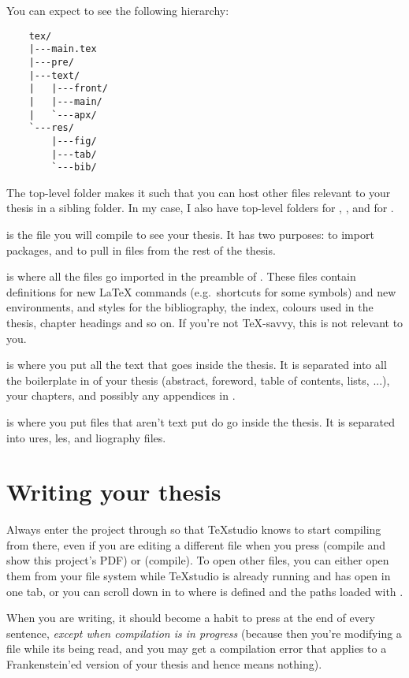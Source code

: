 You can expect to see the following hierarchy:

\begin{BVerbatim}
	tex/
	|---main.tex
	|---pre/
	|---text/
	|   |---front/
	|   |---main/
	|   `---apx/
	`---res/
	    |---fig/
	    |---tab/
	    `---bib/
\end{BVerbatim}

The top-level folder  makes it such that you can host other files relevant to your thesis in a sibling folder. In my case, I also have top-level folders for , , and for .

 is the file you will compile to see your thesis. It has two purposes: to import packages, and to pull in files from the rest of the thesis.

 is where all the files go imported in the preamble of . These files contain definitions for new \LaTeX{} commands (e.g.\ shortcuts for some symbols) and new environments, and styles for the bibliography, the index, colours used in the thesis, chapter headings and so on. If you're not \TeX{}-savvy, this is not relevant to you.

 is where you put all the text that goes inside the thesis. It is separated into all the boilerplate in  of your thesis (abstract, foreword, table of contents, lists, ...), your  chapters, and possibly any appendices in .

 is where you put files that aren't text put do go inside the thesis. It is separated into ures, les, and liography files.

\section{Writing your thesis}
Always enter the project through  so that TeXstudio knows to start compiling from there, even if you are editing a different  file when you press  (compile and show this project's PDF) or  (compile). To open other files, you can either open them from your file system while TeXstudio is already running and has  open in one tab, or you can scroll down in  to where \verb|| is defined and  the paths loaded with \verb||.

When you are writing, it should become a habit to press  at the end of every sentence, \emph{except when compilation is in progress} (because then you're modifying a file while its being read, and you may get a compilation error that applies to a Frankenstein'ed version of your thesis and hence means nothing).

